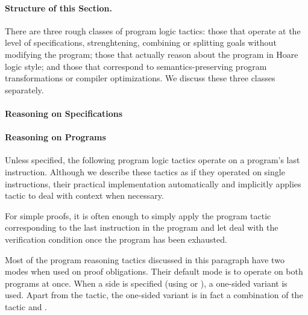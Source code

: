 \paragraph{Structure of this Section.}
There are three rough classes of program logic tactics: those that
operate at the level of specifications, strenghtening, combining or
splitting goals without modifying the program; those that actually
reason about the program in Hoare logic style; and those that
correspond to semantics-preserving program transformations or compiler
optimizations. We discuss these three classes separately.

\paragraph{Reasoning on Specifications}












%

\paragraph{Reasoning on Programs}
Unless specified, the following program logic tactics operate on a
program's last instruction. Although we describe these tactics as if
they operated on single instructions, their practical implementation
automatically and implicitly applies tactic  to deal with
context when necessary.

For simple proofs, it is often enough to simply apply the program
tactic corresponding to the last instruction in the program and let
 deal with the verification condition once the program has
been exhausted.

Most of the program reasoning tactics discussed in this paragraph have
two modes when used on \prhl proof obligations. Their default mode is
to operate on both programs at once. When a side is specified (using
 or ), a one-sided variant is
used. Apart from the  tactic, the one-sided variant is in
fact a combination of the \phl tactic and .

\medskip












